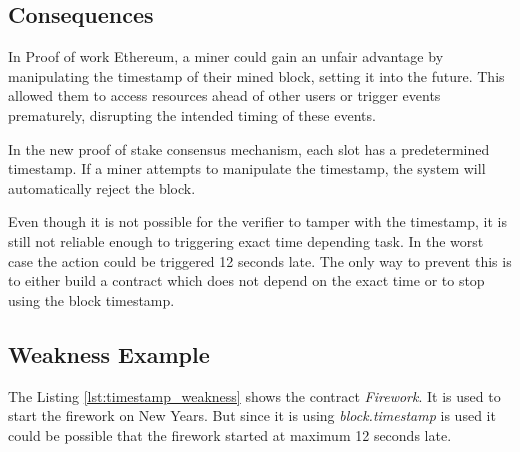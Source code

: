\subsection{Consequences}

In Proof of work Ethereum, a miner could gain an unfair advantage by
manipulating the timestamp of their mined block, setting it into the future.
This allowed them to access resources ahead of other users or trigger events
prematurely, disrupting the intended timing of these events.

In the new proof of stake consensus mechanism, each slot has a predetermined
timestamp. If a miner attempts to manipulate the timestamp, the system will
automatically reject the block.

Even though it is not possible for the verifier to tamper with the timestamp,
it is still not reliable enough to triggering exact time depending task. In the
worst case the action could be triggered 12 seconds late. The only way to
prevent this is to either build a contract which does not depend on the exact
time or to stop using the block timestamp.

\subsection{Weakness Example}



The Listing \ref{lst:timestamp_weakness} shows the contract \textit{Firework}. It
is used to start the firework on New Years. But since it is using
\textit{block.timestamp} is used it could be possible that the firework started
at maximum 12 seconds late.

%
%

    
